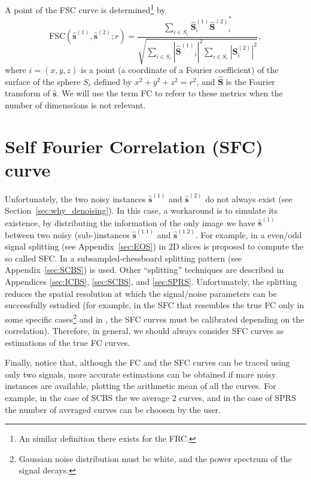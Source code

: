 A point of the FSC curve is determined\footnote{An similar
  definition there exists for the FRC.} by~\cite{verbeke2024self}
\begin{equation}
  \text{FSC}(\hat{\mathbf{s}}^{(1)}, \hat{\mathbf{s}}^{(2)}; r) =
  \frac{\sum_{i \in S_r} \hat{\mathbf{S}}^{(1)}_i {\hat{\mathbf{S}}^{(2)}}_i^*}
  {\sqrt{\sum_{i \in S_r} |{\hat{\mathbf{S}}^{(1)}}_i|^2 \sum_{i \in S_r} |{\mathbf{\mathbf{S}}^{(2)}_i}|^2}},
  \label{eq:FSC}
\end{equation}
where $i=(x, y, z)$ is a point (a coordinate of a Fourier coefficient)
of the surface of the sphere $S_r$ defined by $x^2+y^2+z^2=r^2$, and
$\hat{\mathbf{S}}$ is the Fourier transform of $\hat{\mathbf{s}}$. We
will use the term \gls{FC} to refeer to these metrics when the number
of dimenssions is not relevant.


\section{Self Fourier Correlation (SFC) curve}

Unfortunately, the two noisy instances $\hat{\mathbf{s}}^{(1)}$ and
$\hat{\mathbf{s}}^{(2)}$ do not always exist (see
Section~\ref{sec:why_denoising}).  In this case, a workaround is to
simulate its existence, by distributing the information of the only
image we have $\hat{\mathbf{s}}^{(1)}$ between two noisy
(sub-)instances $\hat{\mathbf{s}}^{(1.1)}$ and
$\hat{\mathbf{s}}^{(1.2)}$. For example, in \cite{verbeke2024self} a
even/odd signal splitting (see Appendix~\ref{sec:EOS}) in 2D slices is
proposed to compute the so called \gls{SFC}. In \cite{koho2019fourier}
a subsampled-chessboard splitting pattern (see
Appendix~\ref{sec:SCBS}) is used. Other ``splitting'' techniques are
described in Appendices \ref{sec:ICBS}, \ref{sec:SCBS}, and
\ref{sec:SPRS}. Unfortunately, the splitting reduces the spatial
resolution at which the signal/noise parameters can be successfully
estudied (for example, in \cite{verbeke2024self} the \gls{SFC} that
resembles the true \gls{FC} only in some specific cases\footnote{Gaussian
  noise distribution must be white, and the power spectrum of the
  signal decays.} and in \cite{koho2019fourier}, the \gls{SFC} curves
must be calibrated depending on the correlation). Therefore, in
general, we should always consider \gls{SFC} curves as estimations of
the true \gls{FC} curves.

Finally, notice that, although the \gls{FC} and the \gls{SFC} curves
can be traced using only two signals, more accurate estimations can be
obtained if more noisy instances are available, plotting the arithmetic mean
of all the curves. For example, in the case of SCBS the we average 2
curves, and in the case of SPRS the number of averaged curves can be
choosen by the user.

